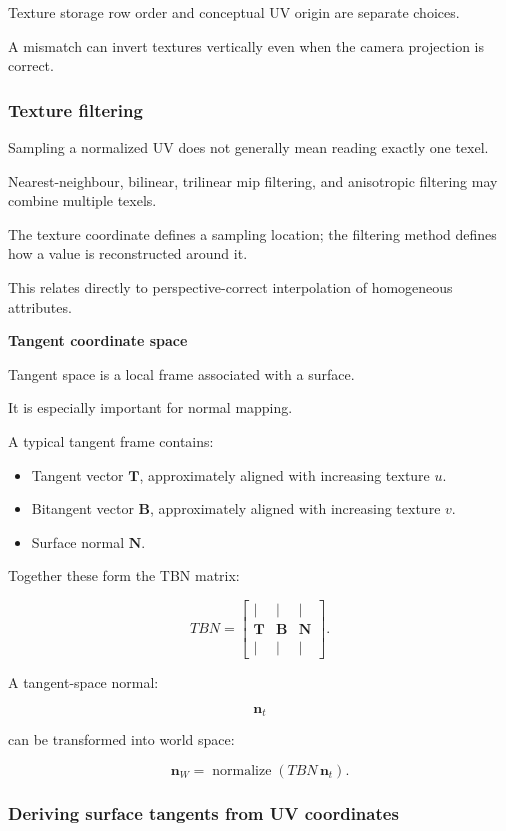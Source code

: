 Texture storage row order and conceptual UV origin are separate choices.

A mismatch can invert textures vertically even when the camera projection is correct.

\subsubsection{Texture filtering}\label{texture-filtering}

Sampling a normalized UV does not generally mean reading exactly one texel.

Nearest-neighbour, bilinear, trilinear mip filtering, and anisotropic filtering may combine multiple texels.

The texture coordinate defines a sampling location; the filtering method defines how a value is reconstructed around it.

This relates directly to perspective-correct interpolation of homogeneous attributes.

\textbf{Tangent coordinate space}

Tangent space is a local frame associated with a surface.

It is especially important for normal mapping.

A typical tangent frame contains:

\begin{itemize}
\tightlist
\item
  Tangent vector \(\mathbf T\), approximately aligned with increasing texture \(u\).
\item
  Bitangent vector \(\mathbf B\), approximately aligned with increasing texture \(v\).
\item
  Surface normal \(\mathbf N\).
\end{itemize}

Together these form the TBN matrix:

\[
 \boxed{ TBN= \begin{bmatrix} |&|&|\\ \mathbf T&\mathbf B&\mathbf N\\ |&|&| \end{bmatrix} }.
\]

A tangent-space normal:

\[
 \mathbf n_t
\]

can be transformed into world space:

\[
 \boxed{ \mathbf n_W= \operatorname{normalize}(TBN\,\mathbf n_t) }.
\]

\subsubsection{Deriving surface tangents from UV coordinates}\label{deriving-surface-tangents-from-uv-coordinates}

